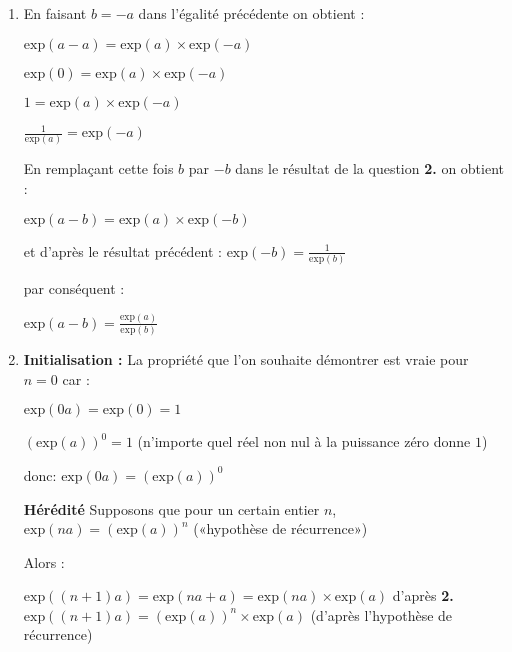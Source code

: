 \begin{corrige}
\begin{enumerate}
     \item
     En faisant $b=-a$ dans l'égalité précédente on obtient :
     \par
     $\text{exp}\left(a-a\right)=\text{exp}\left(a\right)\times \text{exp}\left(-a\right)$
     \par
     $\text{exp}\left(0\right)=\text{exp}\left(a\right)\times \text{exp}\left(-a\right)$
     \par
     $1=\text{exp}\left(a\right)\times \text{exp}\left(-a\right)$
     \par
     $\frac{1}{\text{exp}\left(a\right)}=\text{exp}\left(-a\right)$
     \par
     En remplaçant cette fois $b$ par $-b$ dans le résultat de la question \textbf{2.} on obtient :
     \par
     $\text{exp}\left(a-b\right)=\text{exp}\left(a\right)\times \text{exp}\left(-b\right)$
     \par
     et d'après le résultat précédent : $\text{exp}\left(-b\right)=\frac{1}{\text{exp}\left(b\right)}$
     \par
     par conséquent :
     \par
     $\text{exp}\left(a-b\right)=\frac{\text{exp}\left(a\right)}{\text{exp}\left(b\right)}$
     \item
     \textbf{Initialisation :}
     La propriété que l'on souhaite démontrer est vraie pour $n=0$ car :
     \par
     $\text{exp}\left(0a\right) = \text{exp}\left(0\right) = 1$
     \par
     $\left(\text{exp}\left(a\right)\right)^{0} = 1$ (n'importe quel réel non nul à la puissance zéro donne $1$)
     \par
     donc: $\text{exp}\left(0a\right) =\left(\text{exp}\left(a\right)\right)^{0}$
\par
     \textbf{Hérédité}
     Supposons que pour un certain entier $n$, $\text{exp}\left(na\right) =\left(\text{exp}\left(a\right)\right)^{n}$ («hypothèse de récurrence»)
     \par
     Alors :
     \par
     $\text{exp}\left(\left(n+1\right)a\right)=\text{exp}\left(na+a\right)=\text{exp}\left(na\right)\times \text{exp}\left(a\right)$ d'après \textbf{2.}
     $\text{exp}\left(\left(n+1\right)a\right)=\left(\text{exp}\left(a\right)\right)^{n}\times \text{exp}\left(a\right)$ (d'après l'hypothèse de récurrence)

\end{enumerate}
\end{corrige}
